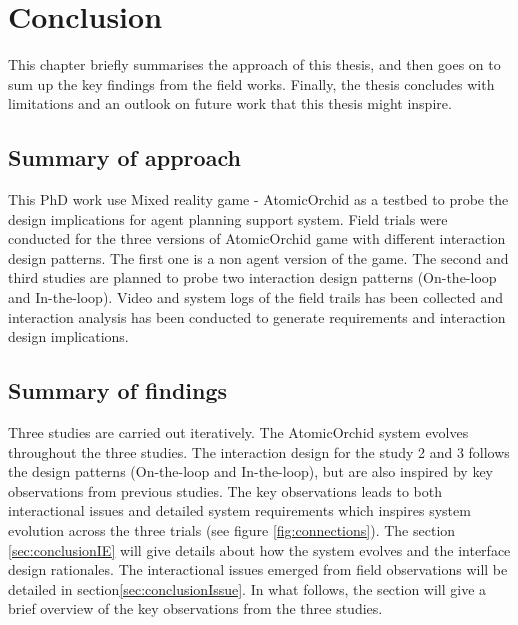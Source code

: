 \chapter{Conclusion}

This chapter briefly summarises the approach of this thesis, and then goes on to sum up the key findings from the field works. Finally, the thesis concludes with limitations and an outlook on future work that this thesis might inspire.\\

\section{Summary of approach}
This PhD work use Mixed reality game - AtomicOrchid as a testbed to probe the design implications for agent planning support system. Field trials were conducted for the three versions of AtomicOrchid game with different interaction design patterns. The first one is a non agent version of the game. The second and third studies are planned to probe two interaction design patterns (On-the-loop and In-the-loop). Video and system logs of the field trails has been collected and interaction analysis has been conducted to generate requirements and interaction design implications. \\


\section{Summary of findings}
Three studies are carried out iteratively. The AtomicOrchid system evolves throughout the three studies. The interaction design for the study 2 and 3 follows the design patterns (On-the-loop and In-the-loop), but are also inspired by key observations from previous studies. The key observations leads to both interactional issues and detailed system requirements which inspires system evolution across the three trials (see figure \ref{fig:connections}).  The section \ref{sec:conclusionIE}  will give details about how the system evolves and the interface design rationales. The interactional issues emerged from field observations will be detailed in section\ref{sec:conclusionIssue}.  In what follows, the section will give a brief overview of the key observations from the three studies.\\ 

